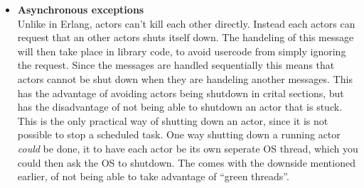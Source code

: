 \documentclass[a4paper]{article}
\begin{document}
\begin{itemize}
\item \textbf{Asynchronous exceptions}\\ %
  Unlike in Erlang, actors can't kill each other directly. Instead each
  actors can request that an other actors shuts itself down. The handeling of
  this message will then take place in library code, to avoid usercode from
  simply ignoring the request. Since the messages are handled sequentially this
  means that actors cannot be shut down when they are handeling another
  messages. This has the advantage of avoiding actors being shutdown in crital
  sections, but has the disadvantage of not being able to shutdown an actor that
  is stuck. This is the only practical way of shutting down an actor, since it
  is not possible to stop a scheduled task. One way shutting down a running
  actor \textit{could} be done, it to have each actor be its own seperate OS
  thread, which you could then ask the OS to shutdown. The comes with the
  downside mentioned earlier, of not being able to take advantage of ``green
  threads''.
\end{itemize}
\end{document}
